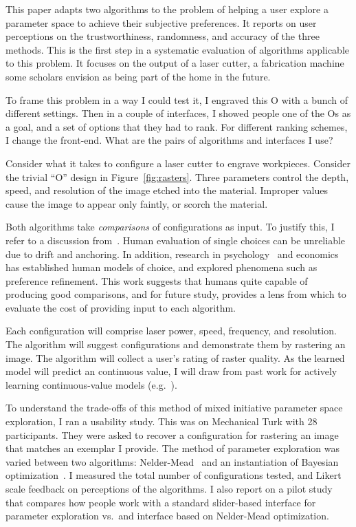 This paper adapts two algorithms to the problem of helping a user explore a parameter space to achieve their subjective preferences.
It reports on user perceptions on the trustworthiness, randomness, and accuracy of the three methods.
This is the first step in a systematic evaluation of algorithms applicable to this problem. 
It focuses on the output of a laser cutter, a fabrication machine some scholars envision as being part of the home in the future.

To frame this problem in a way I could test it, I engraved this O with a bunch of different settings.
Then in a couple of interfaces, I showed people one of the Os as a goal, and a set of options that they had to rank.
For different ranking schemes, I change the front-end.
What are the pairs of algorithms and interfaces I use?

Consider what it takes to configure a laser cutter to engrave workpieces.
Consider the trivial ``O'' design in Figure~\ref{fig:rasters}.
Three parameters control the depth, speed, and resolution of the image etched into the material.
Improper values cause the image to appear only faintly, or scorch the material.
\fi

Both algorithms take \emph{comparisons} of configurations as input.
To justify this, I refer to a discussion from~\cite{brochu_tutorial_2010}.
Human evaluation of single choices can be unreliable due to drift and anchoring.
In addition, research in psychology~\cite{tversky_advances_1992} and economics~\cite{kingsley_preference_2006} has established human models of choice, and explored phenomena such as preference refinement.
This work suggests that humans quite capable of producing good comparisons, and for future study, provides a lens from which to evaluate the cost of providing input to each algorithm.

Each configuration will comprise laser power, speed, frequency, and resolution.
The algorithm will suggest configurations and demonstrate them by rastering an image.
The algorithm will collect a user's rating of raster quality.
As the learned model will predict an continuous value, I will draw from past work for actively learning continuous-value models (e.g.~\cite{sugiyama_active_2008}).
\fi

To understand the trade-offs of this method of mixed initiative parameter space exploration, I ran a usability study.
This was on Mechanical Turk with 28 participants.
They were asked to recover a configuration for rastering an image that matches an exemplar I provide.
The method of parameter exploration was varied between two algorithms: Nelder-Mead~\cite{nelder_simplex_1964} and an instantiation of Bayesian optimization~\cite{brochu_tutorial_2010}.
I measured the total number of configurations tested, and Likert scale feedback on perceptions of the algorithms.
I also report on a pilot study that compares how people work with a standard slider-based interface for parameter exploration vs.\ and interface based on Nelder-Mead optimization.
\fi
